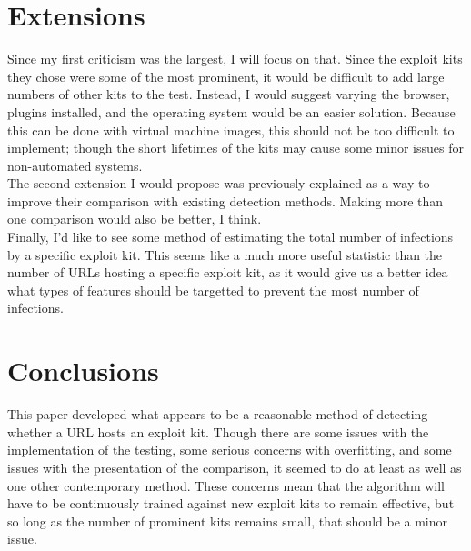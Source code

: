 \documentclass{article}
\begin{document}
\section{Extensions}
Since my first criticism was the largest, I will focus on that.
Since the exploit kits they chose were some of the most prominent,
it would be difficult to add large numbers of other kits to the test.
Instead, I would suggest varying the browser, plugins installed,
and the operating system would be an easier solution.
Because this can be done with virtual machine images,
this should not be too difficult to implement;
though the short lifetimes of the kits may cause some minor issues for non-automated systems.\\
The second extension I would propose was previously explained as a way to improve their comparison with existing detection methods.
Making more than one comparison would also be better, I think.\\
Finally, I'd like to see some method of estimating the total number of infections by a specific exploit kit.
This seems like a much more useful statistic than the number of URLs hosting a specific exploit kit,
as it would give us a better idea what types of features should be targetted to prevent the most number of infections.
\section{Conclusions}
This paper developed what appears to be a reasonable method of detecting whether a URL hosts an exploit kit.
Though there are some issues with the implementation of the testing,
some serious concerns with overfitting, and some issues with the presentation of the comparison,
it seemed to do at least as well as one other contemporary method.
These concerns mean that the algorithm will have to be continuously trained against new exploit kits to remain effective,
but so long as the number of prominent kits remains small, that should be a minor issue.
\end{document}

